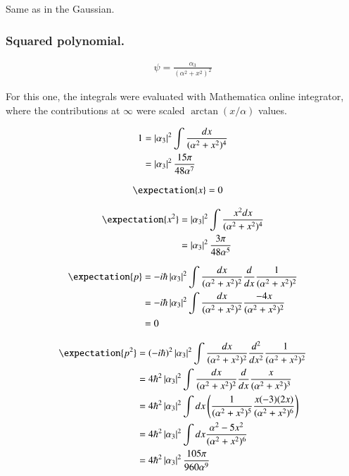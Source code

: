 \documentclass{article}
\begin{document}
Same as in the Gaussian.

\subsubsection{Squared polynomial. }

\begin{align*}
\psi = \frac{\alpha_3}{(\alpha^2 + x^2)^2}
\end{align*}

For this one, the integrals were evaluated with Mathematica online integrator, where the contributions at $\infty$ were scaled $\arctan(x/\alpha)$ values.

\begin{align*}
1 
&= \left\lvert{\alpha_3}\right\rvert^2 \int \frac{dx}{(\alpha^2 + x^2)^4} \\
&= \left\lvert{\alpha_3}\right\rvert^2 \frac{15 \pi}{48 \alpha^7}
\end{align*}

\begin{align*}
\expectation{x} &= 0
\end{align*}

\begin{align*}
\expectation{x^2} 
&= \Abs{\alpha_3}^2 \int \frac{x^2 dx}{(\alpha^2 + x^2)^4} \\
&= \Abs{\alpha_3}^2 \frac{3 \pi}{48 \alpha^5}
\end{align*}

\begin{align*}
\expectation{p} 
&= -i \hbar \Abs{\alpha_3}^2 \int \frac{dx}{(\alpha^2 + x^2)^2} \frac{d}{dx} \frac{1}{(\alpha^2 + x^2)^2}  \\
&= -i \hbar \Abs{\alpha_3}^2 \int \frac{dx}{(\alpha^2 + x^2)^2} \frac{-4x}{(\alpha^2 + x^2)^2} \\
&= 0
\end{align*}

\begin{align*}
\expectation{p^2} 
&= (-i \hbar)^2 \Abs{\alpha_3}^2 \int \frac{dx}{(\alpha^2 + x^2)^2} \frac{d^2}{dx^2} \frac{1}{(\alpha^2 + x^2)^2}  \\
&= 4 \hbar^2 \Abs{\alpha_3}^2 \int \frac{dx}{(\alpha^2 + x^2)^2} \frac{d}{dx} \frac{x}{(\alpha^2 + x^2)^3} \\
&= 4 \hbar^2 \Abs{\alpha_3}^2 \int dx
\left( \frac{1}{(\alpha^2 + x^2)^5} \frac{x(-3)(2x)}{(\alpha^2 + x^2)^6} \right)
\\
&= 4 \hbar^2 \Abs{\alpha_3}^2 \int dx \frac{\alpha^2 - 5x^2}{(\alpha^2 + x^2)^6} 
\\
&= 4 \hbar^2 \Abs{\alpha_3}^2 \frac{105 \pi}{960 \alpha^9}
\\
\end{align*}
\end{document}
